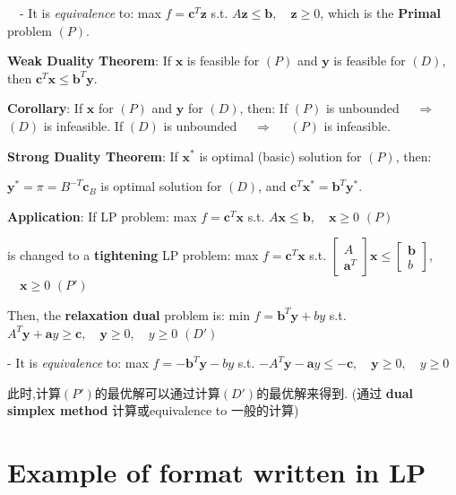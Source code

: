 \documentclass[9pt]{article}
\begin{document}
\qquad \ \ - It is \textit{equivalence} to: max $f=\mathbf{c}^T\mathbf{z}$ \quad s.t. $A\mathbf{z}\leq \mathbf{b}, \quad\mathbf{z}\geq0$, which is the \textbf{Primal} problem $(P)$.

\textbf{Weak Duality Theorem}: If $\mathbf{x}$ is feasible for $(P)$ and $\mathbf{y}$ is feasible for $(D)$, then $\mathbf{c}^T\mathbf{x}\leq\mathbf{b}^T\mathbf{y}$.

\quad \textbf{Corollary}: {\footnotesize If $\mathbf{x}$ for $(P)$ and $\mathbf{y}$ for $(D)$}, then: \qquad If $(P)$ is unbounded \ \ $\Rightarrow$ \ \ $(D)$ is infeasible. \qquad If $(D)$ is unbounded \ \ $\Rightarrow$ \ \ $(P)$ is infeasible.

\textbf{Strong Duality Theorem}: If $\mathbf{x}^*$ is optimal (basic) solution for $(P)$, then:

\qquad $\mathbf{y}^*=\pi=B^{-T}\mathbf{c}_B$ is optimal solution for $(D)$, \quad and $\mathbf{c}^T\mathbf{x}^*=\mathbf{b}^T\mathbf{y}^*$.

\textbf{Application}: If LP problem: max $f=\mathbf{c}^T\mathbf{x}$ \quad s.t. $A\mathbf{x}\leq \mathbf{b}, \quad\mathbf{x}\geq0$ \quad $(P)$

\qquad is changed to a \textbf{tightening} LP problem: max $f=\mathbf{c}^T\mathbf{x}$ \quad s.t. $\begin{bmatrix} A \\ \mathbf{a}^T \end{bmatrix}\mathbf{x}\leq\begin{bmatrix}\mathbf{b} \\ b\end{bmatrix}$, $\quad\mathbf{x}\geq0$ \quad $(P')$

\qquad Then, the \textbf{relaxation dual} problem is: min $f=\mathbf{b}^T\mathbf{y}+by$ \quad s.t. $A^T\mathbf{y}+\mathbf{a}y\geq \mathbf{c}, \quad\mathbf{y}\geq0, \quad y\geq0$ \quad $(D')$

\qquad - It is \textit{equivalence} to: max $f=-\mathbf{b}^T\mathbf{y}-by$ \quad s.t. $-A^T\mathbf{y}-\mathbf{a}y\leq -\mathbf{c}, \quad\mathbf{y}\geq0, \quad y\geq0$

\qquad 此时,计算$(P')$的最优解可以通过计算$(D')$的最优解来得到. {\footnotesize (通过 \textbf{dual simplex method} 计算或equivalence to 一般的计算)}


\section{Example of format written in LP}
\end{document}
